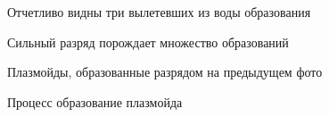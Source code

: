 \documentclass[a4paper]{article}
\begin{document}
\begin{figure}[h!]
    \caption{Отчетливо видны три вылетевших из воды образования}
\end{figure}
\begin{figure}[h!]
    \caption{Сильный разряд порождает множество образований}
\end{figure}
\begin{figure}[h!]
    \caption{Плазмойды, образованные разрядом на предыдущем фото}
\end{figure}
\begin{figure}[h!]
    \caption{Процесс образование плазмойда}
\end{figure}
\end{document}

